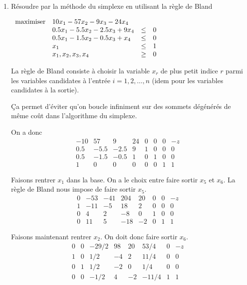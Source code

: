 \begin{enumerate}
  \item Résoudre par la méthode du simplexe en utilisant la règle de Bland

    $
    \begin{array}{llcr}
      \mbox{maximiser} & 10 x_1-57 x_2-9x_3-24x_4\\
      & 0.5x_1-5.5x_2-2.5x_3+9x_4 & \leq & 0\\
      & 0.5x_1-1.5x_2-0.5x_3+x_4 & \leq & 0\\
      & x_1 & \leq &1\\
      & x_1, x_2, x_3, x_4 & \geq & 0
    \end{array}
    $


    \begin{solution}
      La règle de Bland consiste à choisir la variable $x_r$ de plus petit
      indice $r$ parmi les variables candidates à l'entrée $i = 1,2, \dots, n$
      (idem pour les variables candidates à la sortie).

      Ça permet d'éviter qu'on boucle infiniment sur des sommets
      dégénérés de même coût dans l'algorithme du simplexe.

      On a donc
      \[
        \begin{array}{ccccccc|l}
          -10 & 57   & 9    & 24 & 0 & 0 & 0 & -z\\
          \hline
          0.5 & -5.5 & -2.5 &  9 & 1 & 0 & 0 & 0\\
          0.5 & -1.5 & -0.5 &  1 & 0 & 1 & 0 & 0\\
          1   &  0   &  0   &  0 & 0 & 0 & 1 & 1
        \end{array}
      \]

      Faisons rentrer $x_1$ dans la base.
      On a le choix entre faire sortir $x_5$ et $x_6$.
      La règle de Bland nous impose de faire sortir $x_5$.
      \[
        \begin{array}{ccccccc|l}
          0 & -53 & -41 & 204 & 20 & 0 & 0 & -z\\
          \hline
          1 & -11 &  -5 &  18 &  2 & 0 & 0 & 0\\
          0 &   4 &   2 &  -8 &  0 & 1 & 0 & 0\\
          0 &  11 &   5 & -18 & -2 & 0 & 1 & 1
        \end{array}
      \]

      Faisons maintenant rentrer $x_2$.
      On doit donc faire sortir $x_6$.
      \[
        \begin{array}{ccccccc|l}
          0 & 0 & -29/2 & 98 & 20 &  53/4 & 0 & -z\\
          \hline
          1 & 0 &   1/2 & -4 &  2 &  11/4 & 0 & 0\\
          0 & 1 &   1/2 & -2 &  0 &   1/4 & 0 & 0\\
          0 & 0 &  -1/2 &  4 & -2 & -11/4 & 1 & 1
        \end{array}
      \]


\end{solution}
\end{enumerate}
